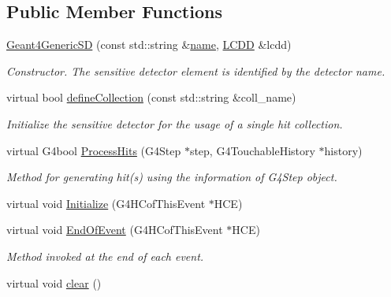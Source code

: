 \subsection*{Public Member Functions}
\begin{DoxyCompactItemize}
\item 
\hyperlink{class_d_d4hep_1_1_simulation_1_1_geant4_generic_s_d_a7ce3d1272f106b20f2f92e50fa2e1996}{Geant4\+Generic\+SD} (const std\+::string \&\hyperlink{class_d_d4hep_1_1_simulation_1_1_geant4_sensitive_detector_a55cba2957295dc39988b888d0b5a5127}{name}, \hyperlink{class_d_d4hep_1_1_geometry_1_1_l_c_d_d}{L\+C\+DD} \&lcdd)
\begin{DoxyCompactList}\small\item\em Constructor. The sensitive detector element is identified by the detector name. \end{DoxyCompactList}\item 
virtual bool \hyperlink{class_d_d4hep_1_1_simulation_1_1_geant4_generic_s_d_a3c70c7c1f1be8bd0e6364327e28228e4}{define\+Collection} (const std\+::string \&coll\+\_\+name)
\begin{DoxyCompactList}\small\item\em Initialize the sensitive detector for the usage of a single hit collection. \end{DoxyCompactList}\item 
virtual G4bool \hyperlink{class_d_d4hep_1_1_simulation_1_1_geant4_generic_s_d_aecea47598186c697197f51c683f13bbb}{Process\+Hits} (G4\+Step $\ast$step, G4\+Touchable\+History $\ast$history)
\begin{DoxyCompactList}\small\item\em Method for generating hit(s) using the information of G4\+Step object. \end{DoxyCompactList}\item 
virtual void \hyperlink{class_d_d4hep_1_1_simulation_1_1_geant4_generic_s_d_a1e65440bc948eb7ba84792fcfdd002ed}{Initialize} (G4\+H\+Cof\+This\+Event $\ast$H\+CE)
\item 
virtual void \hyperlink{class_d_d4hep_1_1_simulation_1_1_geant4_generic_s_d_a07009f3334d1f7125c128cc59fc20e6e}{End\+Of\+Event} (G4\+H\+Cof\+This\+Event $\ast$H\+CE)
\begin{DoxyCompactList}\small\item\em Method invoked at the end of each event. \end{DoxyCompactList}\item 
virtual void \hyperlink{class_d_d4hep_1_1_simulation_1_1_geant4_generic_s_d_acf8f9146d5683a8131fc5d8ee26d7f01}{clear} ()

\end{DoxyCompactItemize}
